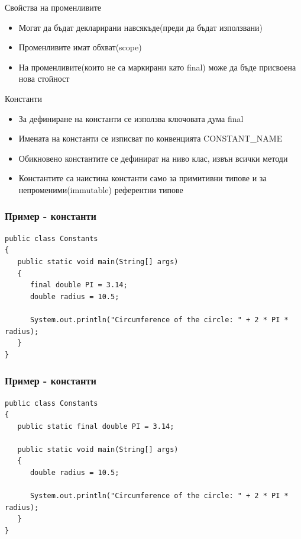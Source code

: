 \documentclass{beamer}
\begin{document}
\begin{frame}{Свойства на променливите}
  \transdissolve
  \begin{itemize}
  \item Могат да бъдат декларирани навсякъде(преди да бъдат
    използвани)
  \item Променливите имат обхват(scope)
  \item На променливите(които не са маркирани като final) може да бъде
    присвоена нова стойност
  \end{itemize}
\end{frame}


\begin{frame}{Константи}
  \begin{itemize}
  \item За дефиниране на константи се използва ключовата дума final
  \item Имената на константи се изписват по конвенцията CONSTANT\_NAME
  \item Обикновено константите се дефинират на ниво клас, извън всички
    методи
  \item Константите са наистина константи само за примитивни типове и
    за непроменими(immutable) референтни типове
  \end{itemize}
\end{frame}

\begin{frame}[fragile]
  \frametitle{Пример - константи}
  \transdissolve
\begin{lstlisting}
public class Constants
{
   public static void main(String[] args)
   {
      final double PI = 3.14;
      double radius = 10.5;

      System.out.println("Circumference of the circle: " + 2 * PI * radius);
   }
}
\end{lstlisting}
\end{frame}

\begin{frame}[fragile]
  \frametitle{Пример - константи}
  \transdissolve
\begin{lstlisting}
public class Constants
{
   public static final double PI = 3.14;

   public static void main(String[] args)
   {
      double radius = 10.5;

      System.out.println("Circumference of the circle: " + 2 * PI * radius);
   }
}
\end{lstlisting}
\end{frame}
\end{document}
